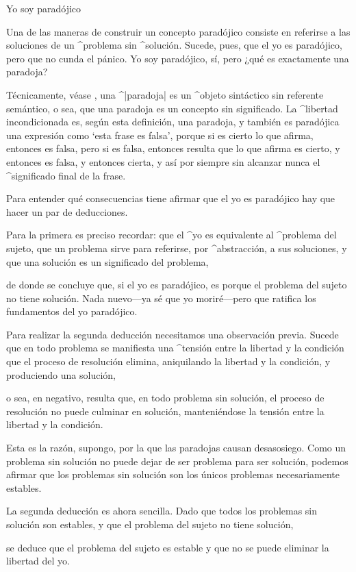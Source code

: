 \Section Yo soy paradójico

Una de las maneras de construir un concepto paradójico consiste en
referirse a las soluciones de un ^{problema} sin ^{solución}. Sucede,
pues, que el yo es paradójico, pero que no cunda el pánico. Yo soy
paradójico, sí, pero ¿qué es exactamente una paradoja?

Técnicamente, véase , una ^|paradoja| es un ^{objeto}
sintáctico sin referente semántico, o sea, que una paradoja es un
concepto sin significado. La ^{libertad} incondicionada es, según esta
definición, una paradoja, y también es paradójica una expresión como
`esta frase es falsa', porque si es cierto lo que afirma, entonces es
falsa, pero si es falsa, entonces resulta que lo que afirma es cierto, y
entonces es falsa, y entonces cierta, y así por siempre sin alcanzar
nunca el ^{significado} final de la frase.

Para entender qué consecuencias tiene afirmar que el yo es paradójico
hay que hacer un par de deducciones.

Para la primera es preciso recordar:
\beginpoints
\point que el ^{yo} es equivalente al ^{problema del sujeto},
\point que un problema sirve para referirse, por ^{abstracción},
       a sus soluciones, y
\point que una solución es un significado del problema,
\par\noindent de donde se concluye que, si el yo es paradójico, es
porque el problema del sujeto no tiene solución. Nada nuevo---ya sé que
yo moriré---pero que ratifica los fundamentos del yo paradójico.
\endpoints

Para realizar la segunda deducción necesitamos una observación previa.
Sucede
\beginpoints
\point que en todo problema se manifiesta una ^{tensión} entre la
libertad y la condición que el proceso de resolución elimina,
aniquilando la libertad y la condición, y produciendo una solución,
\par\noindent o sea, en negativo, resulta
\point que, en todo problema sin solución, el proceso de resolución no
puede culminar en solución, manteniéndose la tensión entre la libertad y
la condición.
\par\noindent Esta es la razón, supongo, por la que las paradojas causan
desasosiego. Como un problema sin solución no puede dejar de ser
problema para ser solución, podemos afirmar que los problemas sin
solución son los únicos problemas necesariamente estables.
\endpoints

La segunda deducción es ahora sencilla. Dado
\beginpoints
\point que todos los problemas sin solución son estables, y
\point que el problema del sujeto no tiene solución,
\par\noindent se deduce que el problema del sujeto es estable y
que no se puede eliminar la libertad del yo.
\endpoints

